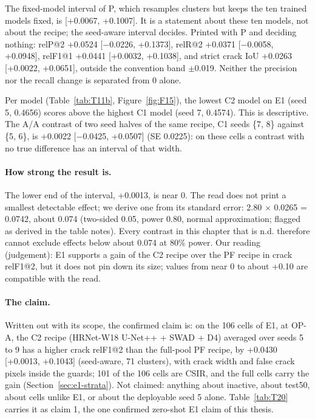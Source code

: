 The fixed-model interval of P, which resamples clusters but keeps the ten trained models fixed, is [+0.0067, +0.1007]. It is a
statement about these ten models, not about the recipe; the seed-aware interval decides. Printed with P and deciding nothing:
relP@2 +0.0524 [$-$0.0226, +0.1373], relR@2 +0.0371 [$-$0.0058, +0.0948], relF1@1 +0.0441 [+0.0032, +0.1038], and strict crack
IoU +0.0263 [+0.0022, +0.0651], outside the convention band $\pm$0.019. Neither the precision nor the recall change is
separated from 0 alone.

Per model (Table~\ref{tab:T11b}, Figure~\ref{fig:F15}), the lowest C2 model on E1 (seed 5, 0.4656) scores above the highest C1 model
(seed 7, 0.4574). This is descriptive. The A/A contrast of two seed halves of the same recipe, C1 seeds \{7, 8\} against
\{5, 6\}, is +0.0022 [$-$0.0425, +0.0507] (SE 0.0225): on these cells a contrast with no true difference has an interval of
that width.


\paragraph{How strong the result is.} The lower end of the interval, +0.0013, is near 0. The read does not print a smallest
detectable effect; we derive one from its standard error: 2.80 $\times$ 0.0265 = 0.0742, about 0.074 (two-sided 0.05, power
0.80, normal approximation; flagged as derived in the table notes). Every contrast in this chapter that is n.d. therefore cannot
exclude effects below about 0.074 at 80\% power. Our reading (judgement): E1 supports a gain of the C2 recipe over the PF recipe
in crack relF1@2, but it does not pin down its size; values from near 0 to about +0.10 are compatible with the read.

\paragraph{The claim.} Written out with its scope, the confirmed claim is: on the 106 cells of E1, at OP-A, the C2 recipe
(HRNet-W18 U-Net++ + SWAD + D4) averaged over seeds 5 to 9 has a higher crack relF1@2 than the full-pool PF recipe, by +0.0430
[+0.0013, +0.1043] (seed-aware, 71 clusters), with crack width and false crack pixels inside the guards; 101 of the 106 cells are
CSIR, and the full cells carry the gain (Section~\ref{sec:e1-strata}). Not claimed: anything about inactive, about test50, about
cells unlike E1, or about the deployable seed 5 alone. Table~\ref{tab:T20} carries it as claim 1, the one confirmed zero-shot E1
claim of this thesis.

